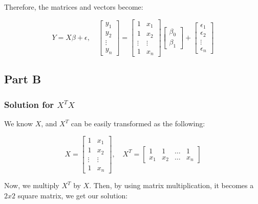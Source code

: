 \documentclass[
  letterpaper,
  DIV=11,
  numbers=noendperiod]{scrartcl}
\begin{document}
Therefore, the matrices and vectors become:

\[ Y = X\beta + \epsilon, \quad \begin{bmatrix} y_1 \\ y_2 \\ \vdots \\ y_n \end{bmatrix} = \begin{bmatrix} 1 & x_1 \\ 1 & x_2 \\ \vdots & \vdots \\ 1 & x_n \end{bmatrix} \begin{bmatrix} \beta_0 \\ \beta_1 \end{bmatrix} + \begin{bmatrix} \epsilon_1 \\ \epsilon_2 \\ \vdots \\ \epsilon_n \end{bmatrix} \]

\newpage{}

\hypertarget{part-b}{%
\subsection{Part B}\label{part-b}}

\hypertarget{solution-for-xtx}{%
\subsubsection{\texorpdfstring{Solution for
\(X^TX\)}{Solution for X\^{}TX}}\label{solution-for-xtx}}

We know \(X\), and \(X^T\) can be easily transformed as the following:

\[ X = \begin{bmatrix} 1 & x_1 \\ 1 & x_2 \\ \vdots & \vdots \\ 1 & x_n \end{bmatrix}, \quad  X^T = \begin{bmatrix} 1 & 1 & \dots & 1 \\ x_1 & x_2 & \dots & x_n \end{bmatrix} \]

Now, we multiply \(X^T\) by \(X\). Then, by using matrix multiplication,
it becomes a \(2x2\) square matrix, we get our solution:
\end{document}
